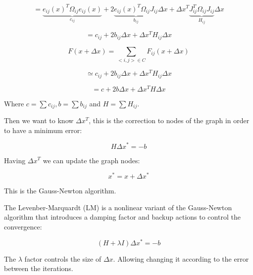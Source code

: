 \begin{equation}
\label{eq:globalFuncAprox2}
 =  \underbrace{e_{ij}(x)^T \Omega_{ij} e_{ij}(x)}_{c_{ij}} + 2  \underbrace{e_{ij}(x)^T \Omega_{ij} J_{ij}}_{b_{ij}} \Delta x + \Delta x^T \underbrace{ J_{ij}^T  \Omega_{ij} J_{ij}}_{H_{ij}} \Delta x
\end{equation}

\begin{equation}
\label{eq:globalFuncAprox2}
 = c_{ij} + 2 b_{ij} \Delta x + \Delta x^T H_{ij} \Delta x
\end{equation}


\begin{equation}
F(x + \Delta x) =  \sum\limits_{<i,j> \in C } F_{ij}(x + \Delta x) 
\end{equation}



\begin{equation}
\simeq  c_{ij} + 2 b_{ij} \Delta x + \Delta x^T H_{ij} \Delta x
\end{equation}

\begin{equation}
=   c + 2 b \Delta x + \Delta x^T H \Delta x
\end{equation}

Where $c=\sum{c_{ij}}, b=\sum{b_{ij}}$ and $H=\sum{H_{ij}}$.

Then we want to know $\Delta x^T$, this is the correction to nodes of the graph in order 
to have a minimum error:

\begin{equation}
H \Delta x^* = -b
\end{equation}

Having $\Delta x^T$ we can update the graph nodes:

\begin{equation}
x^* = x + \Delta x^* 
\end{equation}

This is the Gauss-Newton algorithm. 

The Levenber-Marquardt (LM) is a nonlinear variant of the Gauss-Newton algorithm that introduces a
damping factor and backup actions to control the convergence:

\begin{equation}
(H + \lambda I) \Delta x^* = -b
\end{equation}

The $\lambda$ factor controls the size of $ \Delta x$. Allowing changing it according to the error between the iterations.
 

